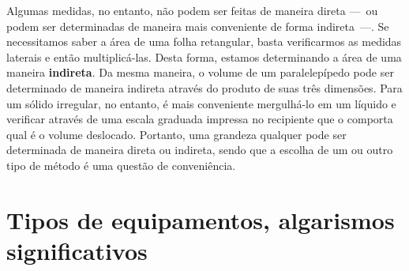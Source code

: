 Algumas medidas, no entanto, não podem ser feitas de maneira direta ---~ou podem ser determinadas de maneira mais conveniente de forma indireta~---. Se necessitamos saber a área de uma folha retangular, basta verificarmos as medidas laterais e então multiplicá-las. Desta forma, estamos determinando a área de uma maneira \textbf{indireta}. Da mesma maneira, o volume de um paralelepípedo pode ser determinado de maneira indireta através do produto de suas três dimensões. Para um sólido irregular, no entanto, é mais conveniente mergulhá-lo em um líquido e verificar através de uma escala graduada impressa no recipiente que o comporta qual é o volume deslocado. Portanto, uma grandeza qualquer pode ser determinada de maneira direta ou indireta, sendo que a escolha de um ou outro tipo de método é uma questão de conveniência.

\section{Tipos de equipamentos, algarismos significativos}

